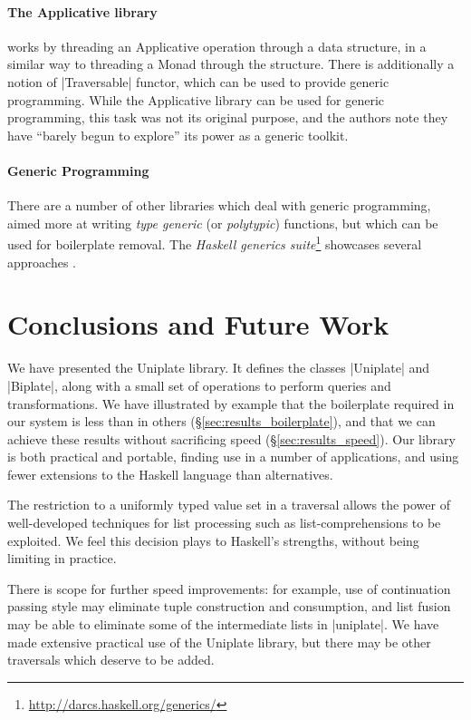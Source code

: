 \paragraph{The Applicative library} \citep{mcbride:applicative} works by threading an Applicative operation through a data structure, in a similar way to threading a Monad through the structure. There is additionally a notion of |Traversable| functor, which can be used to provide generic programming. While the Applicative library can be used for generic programming, this task was not its original purpose, and the authors note they have ``barely begun to explore'' its power as a generic toolkit.

\paragraph{Generic Programming} There are a number of other libraries which deal with generic programming, aimed more at writing \textit{type generic} (or \textit{polytypic}) functions, but which can be used for boilerplate removal. The \textit{Haskell generics suite}\footnote{\url{http://darcs.haskell.org/generics/}} showcases several approaches \citep{weirich:replib,hinze:generics_masses,hinze:generic_haskell}.


\section{Conclusions and Future Work}
\label{sec:conclusion}

We have presented the Uniplate library. It defines the classes |Uniplate| and |Biplate|, along with a small set of operations to perform queries and transformations. We have illustrated by example that the boilerplate required in our system is less than in others (\S\ref{sec:results_boilerplate}), and that we can achieve these results without sacrificing speed (\S\ref{sec:results_speed}). Our library is both practical and portable, finding use in a number of applications, and using fewer extensions to the Haskell language than alternatives.

The restriction to a uniformly typed value set in a traversal allows the power of well-developed techniques for list processing such as list-comprehensions to be exploited. We feel this decision plays to Haskell's strengths, without being limiting in practice.

There is scope for further speed improvements: for example, use of continuation passing style may eliminate tuple construction and consumption, and list fusion may be able to eliminate some of the intermediate lists in |uniplate|. We have made extensive practical use of the Uniplate library, but there may be other traversals which deserve to be added.

